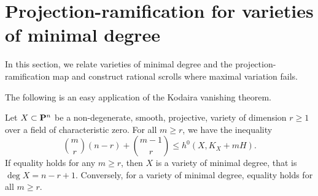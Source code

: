 \section{Projection-ramification for varieties of minimal degree}\label{sec:minimaldegree}
In this section, we relate varieties of minimal degree and the projection-ramification map and construct rational scrolls where maximal variation fails.

The following is an easy application of the Kodaira vanishing theorem.
\begin{proposition}\label{lem:kymh}
  Let $X \subset \P^n$ be a non-degenerate, smooth, projective, variety of dimension $r \geq 1$ over a field of characteristic zero.
  For all $m \geq r$, we have the inequality
  \begin{equation}\label{eqn:KYmH}
    {m \choose r}(n-r) + {{m-1} \choose {r}}\leq h^0(X, K_X + mH).
  \end{equation}
  If equality holds for any $m \geq r$, then $X$ is a variety of minimal degree, that is $\deg X = n-r+1$.
  Conversely, for a variety of minimal degree, equality holds for all $m \geq r$.
\end{proposition}

